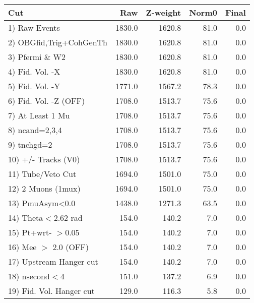  \begin{table}[h!]\centering
 \begin{tabular}{||l||r|r|r|r||}
 \hline
 \hline
 Cut & Raw & Z-weight & Norm0 & Final \\
 \hline
  1) Raw Events           &      1830.0 &      1620.8 &        81.0 &         0.0 \\
  2) OBGfid,Trig+CohGenTh &      1830.0 &      1620.8 &        81.0 &         0.0 \\
  3) Pfermi \& W2         &      1830.0 &      1620.8 &        81.0 &         0.0 \\
  4) Fid. Vol. -X         &      1830.0 &      1620.8 &        81.0 &         0.0 \\
  5) Fid. Vol. -Y         &      1771.0 &      1567.2 &        78.3 &         0.0 \\
  6) Fid. Vol. -Z (OFF)   &      1708.0 &      1513.7 &        75.6 &         0.0 \\
  7) At Least 1 Mu        &      1708.0 &      1513.7 &        75.6 &         0.0 \\
  8) ncand=2,3,4          &      1708.0 &      1513.7 &        75.6 &         0.0 \\
  9) tnchgd=2             &      1708.0 &      1513.7 &        75.6 &         0.0 \\
 10) +/- Tracks (V0)      &      1708.0 &      1513.7 &        75.6 &         0.0 \\
 11) Tube/Veto Cut        &      1694.0 &      1501.0 &        75.0 &         0.0 \\
 12) 2 Muons (1mux)       &      1694.0 &      1501.0 &        75.0 &         0.0 \\
 13) PmuAsym<0.0          &      1438.0 &      1271.3 &        63.5 &         0.0 \\
 14) Theta$<$2.62 rad     &       154.0 &       140.2 &         7.0 &         0.0 \\
 15) Pt+wrt- $>$0.05      &       154.0 &       140.2 &         7.0 &         0.0 \\
 16) Mee $>$ 2.0  (OFF)   &       154.0 &       140.2 &         7.0 &         0.0 \\
 17) Upstream Hanger cut  &       154.0 &       140.2 &         7.0 &         0.0 \\
 18) nsecond$<$4          &       151.0 &       137.2 &         6.9 &         0.0 \\
 19) Fid. Vol. Hanger cut &       129.0 &       116.3 &         5.8 &         0.0 \\

\end{tabular}
\end{table}
